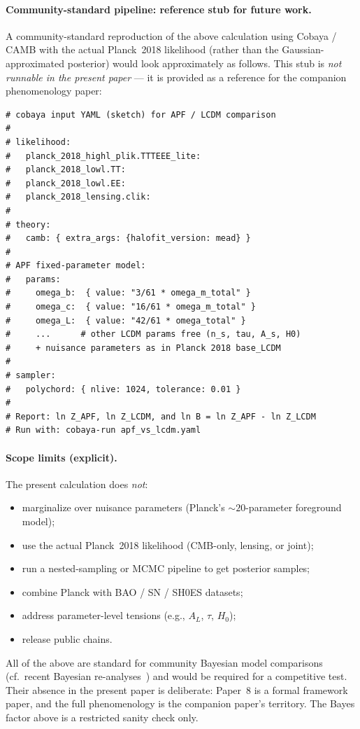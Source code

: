 \documentclass[11pt]{article}
\theoremstyle{plain}
\theoremstyle{definition}
\theoremstyle{remark}
\begin{document}
\paragraph{Community-standard pipeline: reference stub for future work.}  A community-standard reproduction of the above calculation using Cobaya / CAMB with the actual Planck~2018 likelihood (rather than the Gaussian-approximated posterior) would look approximately as follows.  This stub is \emph{not runnable in the present paper} --- it is provided as a reference for the companion phenomenology paper:

\begin{verbatim}
# cobaya input YAML (sketch) for APF / LCDM comparison
#
# likelihood:
#   planck_2018_highl_plik.TTTEEE_lite:
#   planck_2018_lowl.TT:
#   planck_2018_lowl.EE:
#   planck_2018_lensing.clik:
#
# theory:
#   camb: { extra_args: {halofit_version: mead} }
#
# APF fixed-parameter model:
#   params:
#     omega_b:  { value: "3/61 * omega_m_total" }
#     omega_c:  { value: "16/61 * omega_m_total" }
#     omega_L:  { value: "42/61 * omega_total" }
#     ...      # other LCDM params free (n_s, tau, A_s, H0)
#     + nuisance parameters as in Planck 2018 base_LCDM
#
# sampler:
#   polychord: { nlive: 1024, tolerance: 0.01 }
#
# Report: ln Z_APF, ln Z_LCDM, and ln B = ln Z_APF - ln Z_LCDM
# Run with: cobaya-run apf_vs_lcdm.yaml
\end{verbatim}

\paragraph{Scope limits (explicit).}  The present calculation does \emph{not}:
\begin{itemize}[leftmargin=2em,itemsep=1pt,topsep=2pt]
  \item marginalize over nuisance parameters (Planck's $\sim 20$-parameter foreground model);
  \item use the actual Planck~2018 likelihood (CMB-only, lensing, or joint);
  \item run a nested-sampling or MCMC pipeline to get posterior samples;
  \item combine Planck with BAO / SN / SH0ES datasets;
  \item address parameter-level tensions (e.g., $A_L$, $\tau$, $H_0$);
  \item release public chains.
\end{itemize}
All of the above are standard for community Bayesian model comparisons (cf.\ recent Bayesian re-analyses~\cite{BayesianReanalysis1, BayesianReanalysis2}) and would be required for a competitive test.  Their absence in the present paper is deliberate: Paper~8 is a formal framework paper, and the full phenomenology is the companion paper's territory.  The Bayes factor above is a restricted sanity check only.
\end{document}
